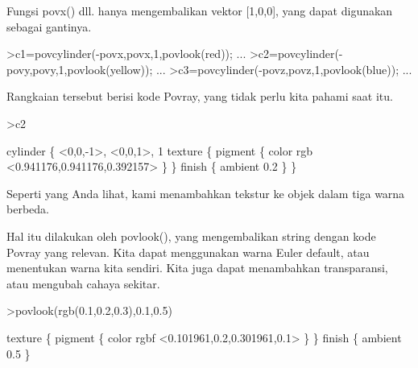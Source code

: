 \documentclass[a4paper,10pt]{article}
\begin{document}
\begin{eulernotebook}
\begin{eulercomment}
\begin{eulercomment}
\begin{eulercomment}
\begin{eulercomment}
\begin{eulercomment}
\begin{eulercomment}
\begin{eulercomment}
\begin{eulercomment}
\begin{eulercomment}
\begin{eulercomment}
\begin{eulercomment}
\begin{eulercomment}
\begin{eulercomment}
\begin{eulercomment}
\begin{eulercomment}
\begin{eulercomment}
\begin{eulercomment}
Fungsi povx() dll. hanya mengembalikan vektor [1,0,0], yang dapat
digunakan sebagai gantinya.
\end{eulercomment}
\begin{eulerprompt}
>c1=povcylinder(-povx,povx,1,povlook(red)); ...
>c2=povcylinder(-povy,povy,1,povlook(yellow)); ...
>c3=povcylinder(-povz,povz,1,povlook(blue)); ...
\end{eulerprompt}
\begin{eulercomment}
Rangkaian tersebut berisi kode Povray, yang tidak perlu kita pahami
saat itu.
\end{eulercomment}
\begin{eulerprompt}
>c2
\end{eulerprompt}
\begin{euleroutput}
  cylinder \{ <0,0,-1>, <0,0,1>, 1
   texture \{ pigment \{ color rgb <0.941176,0.941176,0.392157> \}  \} 
   finish \{ ambient 0.2 \} 
   \}
\end{euleroutput}
\begin{eulercomment}
Seperti yang Anda lihat, kami menambahkan tekstur ke objek dalam tiga
warna berbeda.

Hal itu dilakukan oleh povlook(), yang mengembalikan string dengan
kode Povray yang relevan. Kita dapat menggunakan warna Euler default,
atau menentukan warna kita sendiri. Kita juga dapat menambahkan
transparansi, atau mengubah cahaya sekitar.
\end{eulercomment}
\begin{eulerprompt}
>povlook(rgb(0.1,0.2,0.3),0.1,0.5)
\end{eulerprompt}
\begin{euleroutput}
   texture \{ pigment \{ color rgbf <0.101961,0.2,0.301961,0.1> \}  \} 
   finish \{ ambient 0.5 \} 
  

\end{euleroutput}
\end{eulercomment}
\end{eulercomment}
\end{eulercomment}
\end{eulercomment}
\end{eulercomment}
\end{eulercomment}
\end{eulercomment}
\end{eulercomment}
\end{eulercomment}
\end{eulercomment}
\end{eulercomment}
\end{eulercomment}
\end{eulercomment}
\end{eulercomment}
\end{eulercomment}
\end{eulercomment}
\end{eulernotebook}
\end{document}
